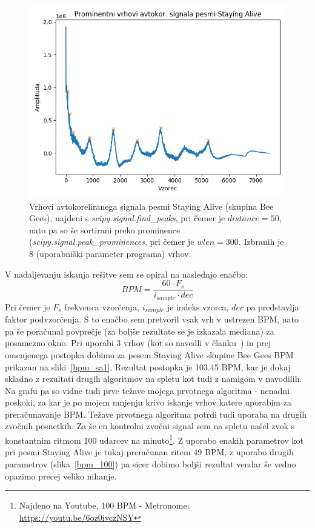 \documentclass[a4paper,11pt]{article}
\begin{document}
\begin{figure}[htbp]
\begin{center}
\includegraphics[scale=0.5]{images/sa_win0_dist50_peaks_prom8.png}
\caption{Vrhovi avtokoreliranega signala pesmi Staying Alive (skupina Bee Gees), najdeni s \textit{scipy.signal.find\_peaks}, pri čemer je $distance = 50$, nato pa so še sortirani preko prominence (\textit{scipy.signal.peak\_prominences}, pri čemer je $wlen = 300$. Izbranih je 8 (uporabniški parameter programa) vrhov.}
\label{peaks1_prom}
\end{center}
\end{figure}

V nadaljevanju iskanja rešitve sem se opiral na naslednjo enačbo:
\begin{equation} \label{eq:bpm}
BPM = \frac{60 \cdot F_s}{i_{sample} \cdot dec}
\end{equation}
Pri čemer je $F_s$ frekvenca vzorčenja, $i_{sample}$ je indeks vzorca, $dec$ pa predstavlja faktor podvzorčenja. S to enačbo sem pretvoril vsak vrh v ustrezen BPM, nato pa še poračunal povprečje (za boljše rezultate se je izkazala mediana) za posamezno okno. Pri uporabi 3 vrhov (kot so navedli v članku~\cite{tzanetakis2002musical}) in prej omenjenega postopka dobimo za pesem Staying Alive skupine Bee Gees BPM prikazan na sliki~\ref{bpm_sa1}. Rezultat postopka je 103.45 BPM, kar je dokaj skladno z rezultati drugih algoritmov na spletu kot tudi z namigom v navodilih. Na grafu pa so vidne tudi prve težave mojega prvotnega algoritma - nenadni poskoki, za kar je po mojem mnjenju krivo iskanje vrhov katere uporabim za preračunavanje BPM. Težave prvotnega algoritma potrdi tudi uporaba na drugih zvočnih posnetkih. Za še en kontrolni zvočni signal sem na spletu našel zvok s konstantnim ritmom 100 udarcev na minuto\footnote{Najdeno na Youtube, 100 BPM - Metronome: \url{https://youtu.be/6oz0ivczNSY}}. Z uporabo enakih parametrov kot pri pesmi Staying Alive je tukaj preračunan ritem 49 BPM, z uporabo drugih parametrov (slika~\ref{bpm_100}) pa sicer dobimo boljši rezultat vendar še vedno opazimo precej veliko nihanje.
\end{document}
